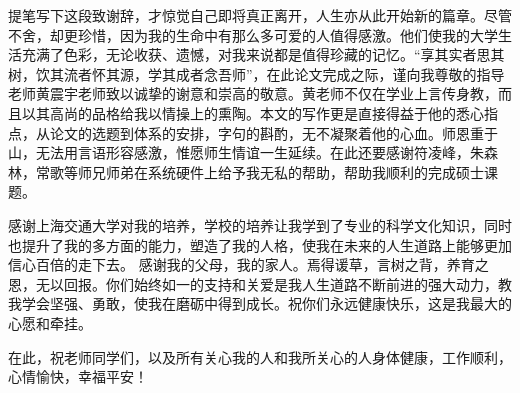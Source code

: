 \begin{thanks}

提笔写下这段致谢辞，才惊觉自己即将真正离开，人生亦从此开始新的篇章。尽管不舍，却更珍惜，因为我的生命中有那么多可爱的人值得感激。他们使我的大学生活充满了色彩，无论收获、遗憾，对我来说都是值得珍藏的记忆。“享其实者思其树，饮其流者怀其源，学其成者念吾师”，在此论文完成之际，谨向我尊敬的指导老师黄震宇老师致以诚挚的谢意和崇高的敬意。黄老师不仅在学业上言传身教，而且以其高尚的品格给我以情操上的熏陶。本文的写作更是直接得益于他的悉心指点，从论文的选题到体系的安排，字句的斟酌，无不凝聚着他的心血。师恩重于山，无法用言语形容感激，惟愿师生情谊一生延续。在此还要感谢符凌峰，朱森林，常歌等师兄师弟在系统硬件上给予我无私的帮助，帮助我顺利的完成硕士课题。

感谢上海交通大学对我的培养，学校的培养让我学到了专业的科学文化知识，同时也提升了我的多方面的能力，塑造了我的人格，使我在未来的人生道路上能够更加信心百倍的走下去。
感谢我的父母，我的家人。焉得谖草，言树之背，养育之恩，无以回报。你们始终如一的支持和关爱是我人生道路不断前进的强大动力，教我学会坚强、勇敢，使我在磨砺中得到成长。祝你们永远健康快乐，这是我最大的心愿和牵挂。

在此，祝老师同学们，以及所有关心我的人和我所关心的人身体健康，工作顺利，心情愉快，幸福平安！
\end{thanks}
